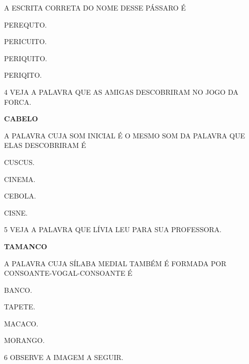 A ESCRITA CORRETA DO NOME DESSE PÁSSARO É

\begin{escolha}

\item PEREQUTO.

\item PERICUITO.

\item PERIQUITO.

\item PERIQITO.

\end{escolha}

\num{4} VEJA A PALAVRA QUE AS AMIGAS DESCOBRIRAM NO JOGO DA FORCA.

\begin{center}
\textbf{CABELO}
\end{center}

A PALAVRA CUJA SOM INICIAL É O MESMO SOM DA PALAVRA QUE ELAS DESCOBRIRAM É

\begin{escolha}

\item CUSCUS.

\item CINEMA.

\item CEBOLA.

\item CISNE.

\end{escolha}

\num{5} VEJA A PALAVRA QUE LÍVIA LEU PARA SUA PROFESSORA.

\begin{center}
\textbf{TAMANCO}
\end{center}

A PALAVRA CUJA SÍLABA MEDIAL TAMBÉM É FORMADA POR CONSOANTE-VOGAL-CONSOANTE É

\begin{escolha}

\item BANCO.

\item TAPETE.

\item MACACO.

\item MORANGO.

\end{escolha}

\num{6} OBSERVE A IMAGEM A SEGUIR.

